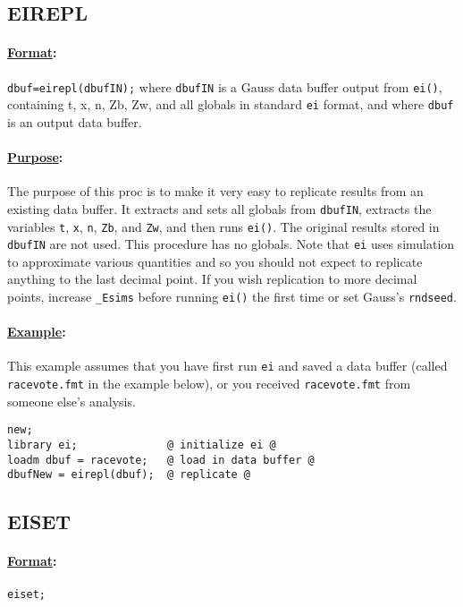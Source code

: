 \documentclass[11pt,titlepage]{article}
\begin{document}
\subsection{EIREPL}

\paragraph{\underline{Format}:} \texttt{dbuf=eirepl(dbufIN);}
where \texttt{dbufIN} is a Gauss data buffer output from
\texttt{ei()}, containing t, x, n, Zb, Zw, and all globals in standard
\texttt{ei} format, and where \texttt{dbuf} is an output data buffer.

\paragraph{\underline{Purpose}:}
The purpose of this proc is to make it very easy to replicate results
from an existing data buffer.  It extracts and sets all globals from
\texttt{dbufIN}, extracts the variables \texttt{t}, \texttt{x},
\texttt{n}, \texttt{Zb}, and \texttt{Zw}, and then runs \texttt{ei()}.
The original results stored in \texttt{dbufIN} are not used.  This
procedure has no globals.  Note that \texttt{ei} uses simulation to
approximate various quantities and so you should not expect to
replicate anything to the last decimal point.  If you wish replication
to more decimal points, increase \texttt{\_Esims} before running
\texttt{ei()} the first time or set Gauss's \texttt{rndseed}.

\paragraph{\underline{Example}:}
This example assumes that you have first run \texttt{ei} and saved a
data buffer (called \texttt{racevote.fmt} in the example below), or
you received \texttt{racevote.fmt} from someone else's analysis.
\begin{verbatim}
new;
library ei;              @ initialize ei @
loadm dbuf = racevote;   @ load in data buffer @
dbufNew = eirepl(dbuf);  @ replicate @
\end{verbatim}

\subsection{EISET}

\paragraph{\underline{Format}:} \texttt{eiset;}
\end{document}
